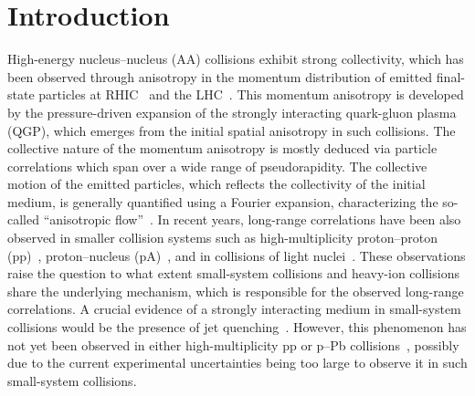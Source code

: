 
\section{Introduction}
\label{sec:intro}

High-energy nucleus--nucleus (AA) collisions exhibit strong collectivity, which has been observed through anisotropy in the momentum distribution of emitted final-state particles at RHIC~\cite{Adams:2005dq,Adcox:2004mh,Arsene:2004fa,Back:2004je} and the LHC~\cite{Abelev:2012di, Abelev:2014pua, ATLAS:2011ah,ALICE:2022wpn}. This momentum anisotropy is developed by the pressure-driven expansion of the strongly interacting quark-gluon plasma (QGP), which emerges from the initial spatial anisotropy in such collisions.
The collective nature of the momentum anisotropy is mostly deduced via particle correlations which span over a wide range of pseudorapidity. The collective motion of the emitted particles, which reflects the collectivity of the initial medium, is generally quantified using a Fourier expansion, characterizing the so-called ``anisotropic flow''~\cite{Ollitrault:1992bk}. In recent years, long-range correlations have been also observed in smaller collision systems such as high-multiplicity proton--proton (pp)~\cite{ATLAS:2015hzw,Khachatryan:2015lva,Khachatryan:2016txc,Acharya:2019vdf,ATLAS:2017rtr}, proton--nucleus (pA)~\cite{ALICE:2012eyl,ATLAS:2014qaj,ATLAS:2016yzd,Khachatryan:2016ibd}, and in collisions of light nuclei~\cite{PHENIX:2018lia,Aidala:2017ajz}. 
These observations raise the question to what extent small-system collisions and heavy-ion collisions share the underlying mechanism, which is responsible for the observed long-range correlations.
A crucial evidence of a strongly interacting medium in small-system collisions would be the presence of jet quenching~\cite{Gyulassy:1990ye,Wang:1991xy}. However, this phenomenon has not yet been observed in either high-multiplicity pp or p--Pb collisions~\cite{Adam:2014qja,Khachatryan:2016odn,Adam:2016jfp,Adam:2016dau,Acharya:2017okq}, possibly due to the current experimental uncertainties being too large to observe it in such small-system collisions.

